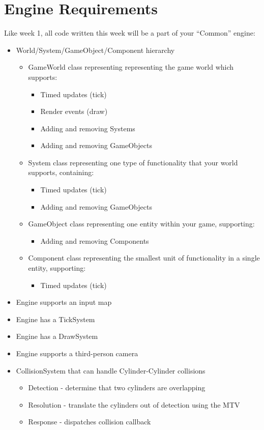 \documentclass{../cs195u}
\begin{document}
\section*{Engine Requirements}
Like week 1, all code written this week will be a part of your ``Common'' engine:
\begin{itemize}
	\item World/System/GameObject/Component hierarchy
   	\begin{itemize}
    		\item GameWorld class representing representing the game world which supports:
    		\begin{itemize}
     			\item Timed updates (tick)
     			\item Render events (draw)
     			\item Adding and removing Systems
     			\item Adding and removing GameObjects
    		\end{itemize}

  		\item System class representing one type of functionality that your world supports, containing:
    		\begin{itemize}
    			 \item Timed updates (tick)
    			 \item Adding and removing GameObjects
    		\end{itemize}

		\item GameObject class representing one entity within your game, supporting:
		 \begin{itemize}
			\item Adding and removing Components
		\end{itemize}

  		 \item Component class representing the smallest unit of functionality in a single entity, supporting:
 		\begin{itemize}
       			\item Timed updates (tick)
		\end{itemize}
	\end{itemize}

	\item Engine supports an input map
	\item Engine has a TickSystem
	\item Engine has a DrawSystem
	\item Engine supports a third-person camera

   	\item CollisionSystem that can handle Cylinder-Cylinder collisions
  	 \begin{itemize}
   		 \item Detection - determine that two cylinders are overlapping
   		 \item Resolution - translate the cylinders out of detection using the MTV
   		 \item Response - dispatches collision callback
  	 \end{itemize}
\end{itemize}
 
\end{document}
